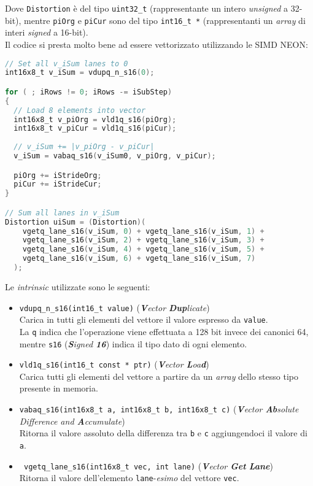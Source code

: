 Dove \verb|Distortion| è del tipo \verb|uint32_t| (rappresentante un intero 
\emph{unsigned} a 32-bit), mentre \verb|piOrg| e \verb|piCur| sono del tipo 
\verb|int16_t *| (rappresentanti un \emph{array} di interi \emph{signed} a 
16-bit).\\

Il codice si presta molto bene ad essere vettorizzato utilizzando le SIMD NEON:

\begin{lstlisting}[language=C]
// Set all v_iSum lanes to 0
int16x8_t v_iSum = vdupq_n_s16(0);

for ( ; iRows != 0; iRows -= iSubStep)
{
  // Load 8 elements into vector
  int16x8_t v_piOrg = vld1q_s16(piOrg);
  int16x8_t v_piCur = vld1q_s16(piCur);
  
  // v_iSum += |v_piOrg - v_piCur|
  v_iSum = vabaq_s16(v_iSum0, v_piOrg, v_piCur);

  piOrg += iStrideOrg;
  piCur += iStrideCur;
}

// Sum all lanes in v_iSum
Distortion uiSum = (Distortion)(
    vgetq_lane_s16(v_iSum, 0) + vgetq_lane_s16(v_iSum, 1) +
    vgetq_lane_s16(v_iSum, 2) + vgetq_lane_s16(v_iSum, 3) +
    vgetq_lane_s16(v_iSum, 4) + vgetq_lane_s16(v_iSum, 5) +
    vgetq_lane_s16(v_iSum, 6) + vgetq_lane_s16(v_iSum, 7)
  );
\end{lstlisting}

Le \emph{intrinsic} utilizzate sono le seguenti:

\begin{itemize}
  \item \verb|vdupq_n_s16(int16_t value)| (\emph{\textbf{V}ector 
    \textbf{Dup}licate})\\
      Carica in tutti gli elementi del vettore il valore espresso da 
      \verb|value|.\\
      La \verb|q| indica che l'operazione viene effettuata a 128 bit invece dei 
      canonici 64, mentre \verb|s16| (\emph{\textbf{S}igned \textbf{16}}) 
      indica il tipo dato di ogni elemento.
  \item \verb|vld1q_s16(int16_t const * ptr)| (\emph{\textbf{V}ector 
    \textbf{L}oa\textbf{d}})\\
      Carica tutti gli elementi del vettore a partire da un \emph{array} dello 
      stesso tipo presente in memoria.
  \item \verb|vabaq_s16(int16x8_t a, int16x8_t b, int16x8_t c)| 
    (\emph{\textbf{V}ector \textbf{Ab}solute Difference and 
    \textbf{A}ccumulate})\\
      Ritorna il valore assoluto della differenza tra \verb|b| e \verb|c| 
      aggiungendoci il valore di \verb|a|.
  \item \verb| vgetq_lane_s16(int16x8_t vec, int lane)| (\emph{\textbf{V}ector 
    \textbf{Get} \textbf{Lane}})\\
      Ritorna il valore dell'elemento \verb|lane|-\emph{esimo} del vettore 
      \verb|vec|.      
\end{itemize}

